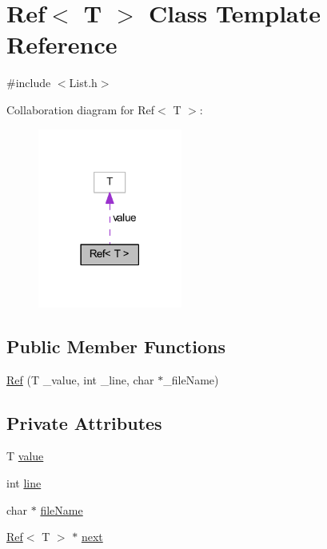 \hypertarget{class_ref}{\section{Ref$<$ T $>$ Class Template Reference}
\label{class_ref}
}


{\ttfamily \#include $<$List.\-h$>$}



Collaboration diagram for Ref$<$ T $>$\-:
\nopagebreak
\begin{figure}[H]
\begin{center}
\leavevmode
\includegraphics[width=134pt]{class_ref__coll__graph}
\end{center}
\end{figure}
\subsection*{Public Member Functions}
\begin{DoxyCompactItemize}
\item 
\hyperlink{class_ref_a6a059a383da2e5721996ca689167f3aa}{Ref} (T \-\_\-value, int \-\_\-line, char $\ast$\-\_\-file\-Name)
\end{DoxyCompactItemize}
\subsection*{Private Attributes}
\begin{DoxyCompactItemize}
\item 
T \hyperlink{class_ref_a29d8316b2ffdc7b729efe715354939a5}{value}
\item 
int \hyperlink{class_ref_ae083f82bbdedc5c5f3bb42c05b6ef810}{line}
\item 
char $\ast$ \hyperlink{class_ref_a857cf85cc41d722e4ac58f22d31e2605}{file\-Name}
\item 
\hyperlink{class_ref}{Ref}$<$ T $>$ $\ast$ \hyperlink{class_ref_aaad23b64a53270e7539d79df0c5ab386}{next}
\end{DoxyCompactItemize}
